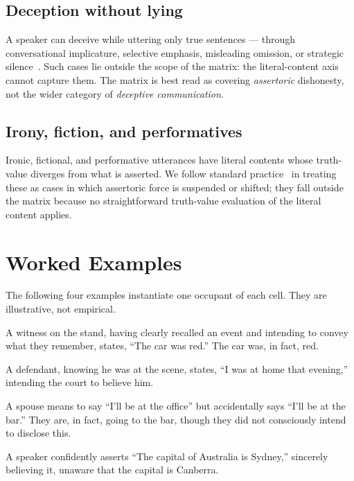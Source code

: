 \documentclass[11pt,a4paper]{article}
\begin{document}
\subsection{Deception without lying}
A speaker can deceive while uttering only true sentences --- through
conversational implicature, selective emphasis, misleading omission, or
strategic silence~\cite{grice1975,saul2012}. Such cases lie outside the
scope of the matrix: the literal-content axis cannot capture them. The
matrix is best read as covering \emph{assertoric} dishonesty, not the
wider category of \emph{deceptive communication}.

\subsection{Irony, fiction, and performatives}
Ironic, fictional, and performative utterances have literal contents
whose truth-value diverges from what is asserted. We follow standard
practice~\cite{grice1975} in treating these as cases in which
assertoric force is suspended or shifted; they fall outside the matrix
because no straightforward truth-value evaluation of the literal
content applies.

\section{Worked Examples}
\label{sec:examples}

The following four examples instantiate one occupant of each cell. They
are illustrative, not empirical.

\begin{description}[style=nextline]
  \item[\textbf{Sincere truth-telling (True, Conscious).}]
    A witness on the stand, having clearly recalled an event and
    intending to convey what they remember, states, ``The car was
    red.'' The car was, in fact, red.
  \item[\textbf{Deliberate lie (False, Conscious).}]
    A defendant, knowing he was at the scene, states, ``I was at home
    that evening,'' intending the court to believe him.
  \item[\textbf{Unintended truth (True, Unconscious).}]
    A spouse means to say ``I'll be at the office'' but accidentally
    says ``I'll be at the bar.'' They are, in fact, going to the bar,
    though they did not consciously intend to disclose this.
  \item[\textbf{Unwitting falsehood (False, Unconscious).}]
    A speaker confidently asserts ``The capital of Australia is
    Sydney,'' sincerely believing it, unaware that the capital is
    Canberra.
\end{description}
\end{document}
